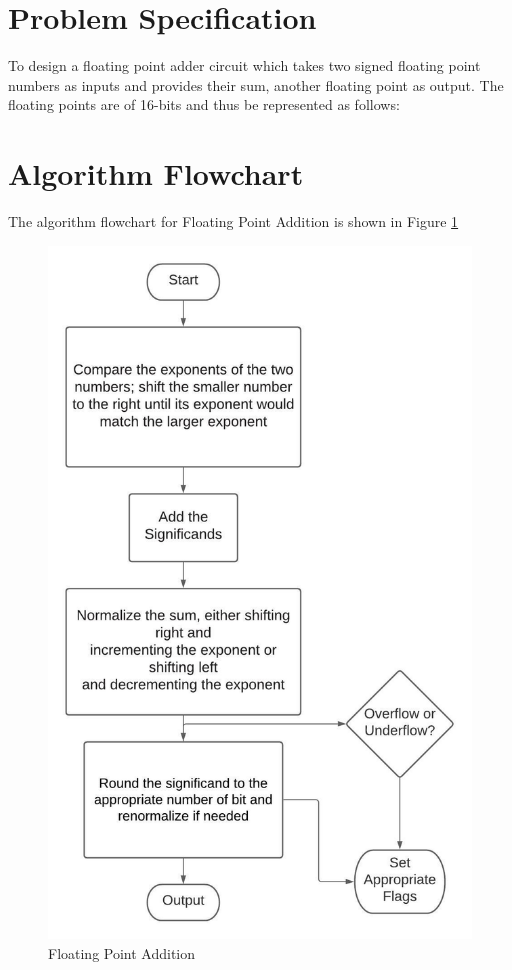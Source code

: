 \documentclass[12pt, a4paper]{article}
\begin{document}
	\section{Problem Specification}
	To design a floating point adder circuit which takes two signed floating
	point numbers as inputs and provides their sum, another floating point as
	output. The floating points are of 16-bits and thus be represented as
	follows:
	\vspace*{0.75cm}
	\begin{table}[h]
		\begin{center}
		\end{center}
	\end{table}
	\section{Algorithm Flowchart}
	The algorithm flowchart for Floating Point Addition is shown in Figure \ref{fig1}
	\newpage
	\begin{figure}[h!]
		\centering
		\includegraphics[width = 0.7\linewidth]{algo}
		\caption{Floating Point Addition}
		\label{fig1}
	\end{figure}
	\newpage
\end{document}
